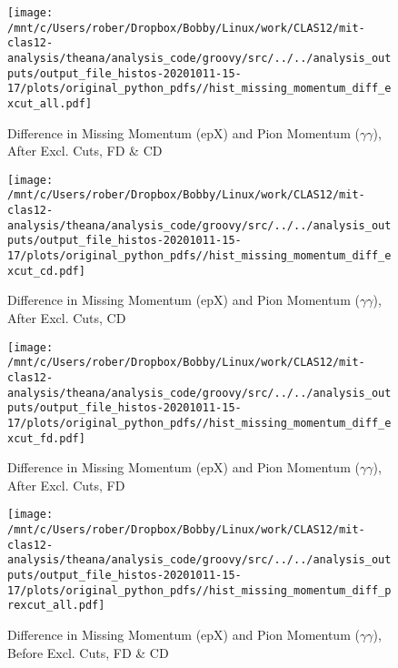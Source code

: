 \documentclass{article}
\begin{document}
\begin{landscape}
\begin{figure}[h]
        \texttt{[image: /mnt/c/Users/rober/Dropbox/Bobby/Linux/work/CLAS12/mit-clas12-analysis/theana/analysis\_code/groovy/src/../../analysis\_outputs/output\_file\_histos-20201011-15-17/plots/original\_python\_pdfs//hist\_missing\_momentum\_diff\_excut\_all.pdf]}
        \captionsetup{textformat=empty,labelformat=blank}
        \caption{Difference in Missing Momentum (epX) and Pion Momentum ($\gamma$$\gamma$), After Excl. Cuts, FD \& CD}
    \end{figure}
    \clearpage
    
    \begin{figure}[h]
        \centering

        \texttt{[image: /mnt/c/Users/rober/Dropbox/Bobby/Linux/work/CLAS12/mit-clas12-analysis/theana/analysis\_code/groovy/src/../../analysis\_outputs/output\_file\_histos-20201011-15-17/plots/original\_python\_pdfs//hist\_missing\_momentum\_diff\_excut\_cd.pdf]}
        \captionsetup{textformat=empty,labelformat=blank}
        \caption{Difference in Missing Momentum (epX) and Pion Momentum ($\gamma$$\gamma$), After Excl. Cuts, CD}
    \end{figure}
    \clearpage
    
    \begin{figure}[h]
        \centering

        \texttt{[image: /mnt/c/Users/rober/Dropbox/Bobby/Linux/work/CLAS12/mit-clas12-analysis/theana/analysis\_code/groovy/src/../../analysis\_outputs/output\_file\_histos-20201011-15-17/plots/original\_python\_pdfs//hist\_missing\_momentum\_diff\_excut\_fd.pdf]}
        \captionsetup{textformat=empty,labelformat=blank}
        \caption{Difference in Missing Momentum (epX) and Pion Momentum ($\gamma$$\gamma$), After Excl. Cuts, FD}
    \end{figure}
    \clearpage
    
    \begin{figure}[h]
        \centering

        \texttt{[image: /mnt/c/Users/rober/Dropbox/Bobby/Linux/work/CLAS12/mit-clas12-analysis/theana/analysis\_code/groovy/src/../../analysis\_outputs/output\_file\_histos-20201011-15-17/plots/original\_python\_pdfs//hist\_missing\_momentum\_diff\_prexcut\_all.pdf]}
        \captionsetup{textformat=empty,labelformat=blank}
        \caption{Difference in Missing Momentum (epX) and Pion Momentum ($\gamma$$\gamma$), Before Excl. Cuts, FD \& CD}
    \end{figure}
    \clearpage
    
    \begin{figure}[h]
        \centering


\end{figure}
\end{landscape}
\end{document}
